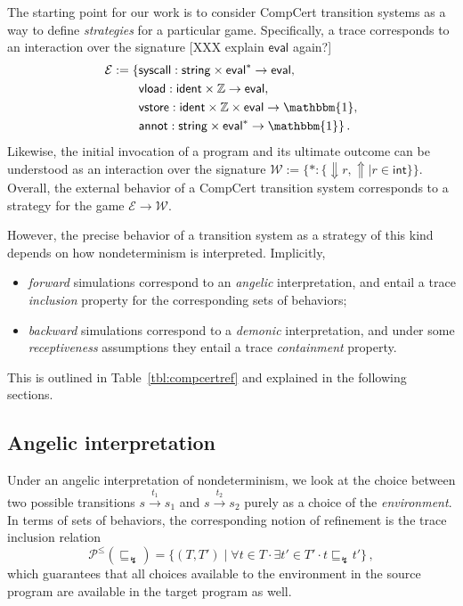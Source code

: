 \documentclass[sigplan,10pt,review,anonymous]{acmart}
\newcommand{\kw}[1]{\ensuremath{ \mathsf{#1} }}
\newcommand{\refby}{\sqsubseteq}
\newcommand{\bdot}{\cdot}
\begin{document}
The starting point for our work
is to consider CompCert transition systems
as a way to define \emph{strategies}
for a particular game.
Specifically,
a trace corresponds to an interaction
over the signature
[XXX explain $\kw{eval}$ again?]
\begin{align*}
  \mathcal{E} := \{ {}
    &\kw{syscall} :
      \kw{string} \times \kw{eval}^* \rightarrow \kw{eval},
      \\
    &\kw{vload} :
      \kw{ident} \times \mathbb{Z} \rightarrow \kw{eval},
      \\
    &\kw{vstore} :
      \kw{ident} \times \mathbb{Z} \times \kw{eval} \rightarrow \mathbbm{1},
      \\
    &\kw{annot} :
      \kw{string} \times \kw{eval}^* \rightarrow \mathbbm{1}
  \}
  \,.
\end{align*}
Likewise,
the initial invocation of a program
and its ultimate outcome can
be understood as an interaction over the signature
$
  \mathcal{W} := \{
    {*} : \{ {\Downarrow} r, {\Uparrow} \mid r \in \kw{int} \}
  \}
$.
Overall,
the external behavior of
a CompCert transition system
corresponds to a strategy
for the game $\mathcal{E} \rightarrow \mathcal{W}$.

However,
the precise behavior of a transition system
as a strategy of this kind
depends on how nondeterminism is interpreted.
Implicitly,
\begin{itemize}
  \item
    \emph{forward} simulations
    correspond to an \emph{angelic} interpretation,
    and entail a trace \emph{inclusion} property
    for the corresponding sets of behaviors;
  \item
    \emph{backward} simulations
    correspond to a \emph{demonic} interpretation, and
    under some \emph{receptiveness} assumptions
    they entail a trace \emph{containment} property.
\end{itemize}
This is outlined in Table~\ref{tbl:compcertref}
and explained in the following sections.


\subsection{Angelic interpretation} \label{sec:sem:fsim} %

Under an angelic interpretation of nondeterminism,
we look at the choice between two possible transitions
$
  s \stackrel{t_1}{\longrightarrow} s_1
$
and
$
  s \stackrel{t_2}{\longrightarrow} s_2
$
purely as a choice of the \emph{environment}.
In terms of sets of behaviors,
the corresponding notion of refinement
is the trace inclusion relation
\[
  \mathcal{P}^\le({\refby_\lightning}) =
  \{ (T, T') \mid \forall t \in T \bdot \exists t' \in T' \bdot
      t \refby_\lightning t' \}
  \,,
\]
which guarantees that
all choices available to the environment in the source program
are available in the target program as well.
\end{document}
